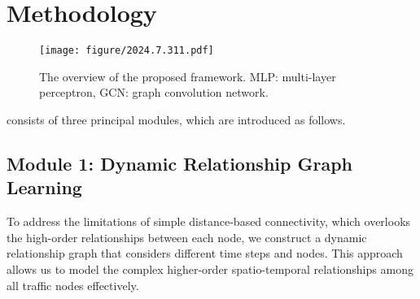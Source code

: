 \section{Methodology}

\begin{figure*}
    \begin{center}
    \texttt{[image: figure/2024.7.311.pdf]}
    \caption{The overview of the proposed framework. MLP: multi-layer perceptron, GCN: graph convolution network.}
    \vspace{-6mm}
    \label{fig:overview}
    \end{center}
\end{figure*}

\model consists of three principal modules, which are introduced as follows. %

\subsection{Module 1: Dynamic Relationship Graph Learning}

 To address the limitations of simple distance-based connectivity, which overlooks the high-order relationships between each node, we construct a dynamic relationship graph that considers different time steps and nodes. This approach allows us to model the complex higher-order spatio-temporal relationships among all traffic nodes effectively.

